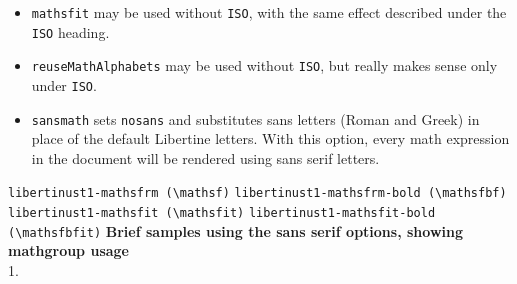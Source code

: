 \documentclass{article}
\begin{document}
\begin{itemize}
\begin{itemize}
\item New commands are provided: \verb|\mathboldsans| means \verb|\mathsfbfit|, and 
	\verb|\mathbold| means \verb|\mathbfit|, while each of 
	\verb|\vectorsym|, 
	\verb|\matrixsym| means \verb|\mathbfit|, and 
	\verb|\tensorsym| means \verb|\mathsfbfit|. For example, \verb|$\matrixsym{A}$| renders as $\mathbfit{A}$, in accordance with ISO rules.
\item If you add the option {\tt mathsfit}, then you also have access to sans italic math, which ISO regards as an option for some special cases. This will use another math family.
\item The option {\tt reuseMathAlphabets} may be added, and can reduce math family usage by redefining \verb|\mathbf| to mean \verb|\mathbfit| (math bold italic) and \verb|\mathsf| to mean \verb|\mathsfbfit| (sans math bold italic.) 
\item As it may be important to keep track of your math families when using ISO, I've added \verb|\ShowMathFamilies|. If you get an error message  ``too many math alphabets used in version normal'', run the macro just before the error location to get an idea of its cause.\end{itemize}
\item
{\tt mathsfit} may be used without {\tt ISO}, with the same effect described under the {\tt ISO} heading.
\item {\tt reuseMathAlphabets} may be used without {\tt ISO}, but really makes sense only under {\tt ISO}.
\item {\tt sansmath} sets {\tt nosans} and substitutes sans letters (Roman and Greek) in place of the default Libertine letters. With this option, every math expression in the document will be rendered using sans serif letters.

\end{itemize}
\newpage
\verb|libertinust1-mathsfrm (\mathsf)|
\newpage
\verb|libertinust1-mathsfrm-bold (\mathsfbf)|
\newpage
\verb|libertinust1-mathsfit (\mathsfit)|
\newpage
\verb|libertinust1-mathsfit-bold (\mathsfbfit)|
\newpage
\textbf{\Large Brief samples using the sans serif options, showing mathgroup usage}\\

{\Large1}.
\end{document}
